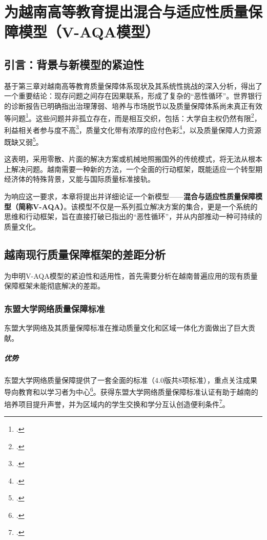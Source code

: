 

\chapter{为越南高等教育提出混合与适应性质量保障模型（V-AQA模型）}
\label{chap:de_xuat_vqa}

\section[引言]{引言：背景与新模型的紧迫性}

基于第三章对越南高等教育质量保障体系现状及其系统性挑战的深入分析，得出了一个重要结论：现存问题之间存在因果联系，形成了复杂的“恶性循环”。世界银行的诊断报告已明确指出治理薄弱、培养与市场脱节以及质量保障体系尚未真正有效等问题\footcite{worldbank_improvingperformance}。这些问题并非孤立存在，而是相互交织，包括：大学自主权仍然有限\footcite{world-bank_improvingperformance}，利益相关者参与度不高\footcite{pmc_article_9127449}，质量文化带有浓厚的应付色彩\footcite{vjol_reactiveculture}，以及质量保障人力资源既缺又弱\footcite{pmc_article_9127449}。

这表明，采用零散、片面的解决方案或机械地照搬国外的传统模式，将无法从根本上解决问题。越南需要一种新的方法，一个全面的行动框架，既能适应一个转型期经济体的特殊背景，又能与国际质量标准接轨。

为响应这一要求，本章将提出并详细论证一个新模型——\textbf{混合与适应性质量保障模型（简称V-AQA）}。该模型不仅是一系列孤立解决方案的集合，更是一个系统的思维和行动框架，旨在直接打破已指出的“恶性循环”，并从内部推动一种可持续的质量文化。

\section{越南现行质量保障框架的差距分析}
\label{sec:phan_tich_khoang_trong}

为申明V-AQA模型的紧迫性和适用性，首先需要分析在越南普遍应用的现有质量保障框架未能彻底解决的差距。

\subsection{东盟大学网络质量保障标准}

东盟大学网络及其质量保障标准在推动质量文化和区域一体化方面做出了巨大贡献。

\paragraph{优势} 东盟大学网络质量保障提供了一套全面的标准（4.0版共8项标准），重点关注成果导向教育和以学习者为中心\footcite{AUN-QAGuide}。获得东盟大学网络质量保障标准认证有助于越南的培养项目提升声誉，并为区域内的学生交换和学分互认创造便利条件\footcite{hoasen_benefits_aunqa}。

